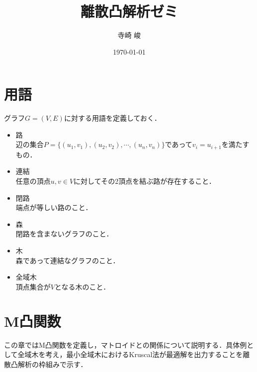 \documentclass[a4paper]{jsarticle}
\title{離散凸解析ゼミ}
\author{寺崎 峻}
\date{\today}
\theoremstyle{break}
\begin{document}
\maketitle
\section*{用語}
グラフ$G=(V,E)$に対する用語を定義しておく．
\begin{itemize}
  \item 路 \\
    辺の集合$P = \{(u_1,v_1),(u_2,v_2),\cdots,(u_n,v_n)\}$であって$v_i = u_{i+1}$を満たすもの．
  \item 連結 \\
    任意の頂点$u,v\in V$に対してその2頂点を結ぶ路が存在すること．
  \item 閉路 \\
    端点が等しい路のこと．
  \item 森 \\
    閉路を含まないグラフのこと．
  \item 木 \\
    森であって連結なグラフのこと．
  \item 全域木 \\
    頂点集合が$V$となる木のこと．
\end{itemize}
\section{M凸関数}
この章ではM凸関数を定義し，マトロイドとの関係について説明する．具体例として全域木を考え，最小全域木におけるKruscal法が最適解を出力することを離散凸解析の枠組みで示す．
\end{document}
